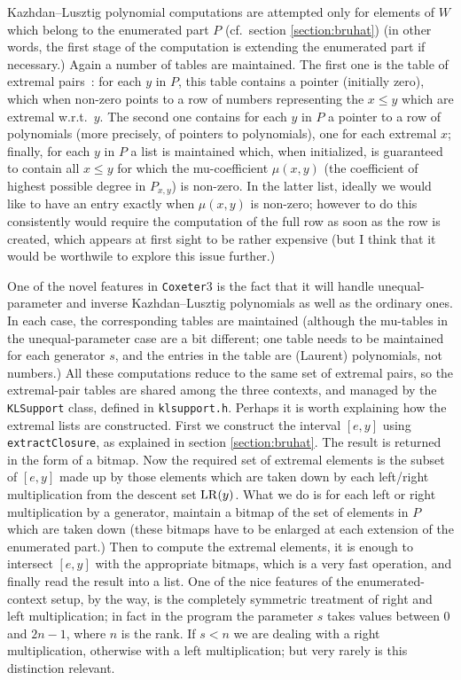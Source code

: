 \documentclass[11pt]{article}
\newcommand{\coxeter}{{\tt Coxeter}}
\newcommand{\klpol}{Kazh\-dan--Lusz\-tig po\-ly\-no\-mial}
\newcommand{\LR}{{\rm LR}}
\begin{document}
\klpol{} computations are attempted only for elements of $W$ which belong
to the enumerated part $P$ (cf.\ section \ref{section:bruhat}) (in other 
words, the first stage of the computation is extending the enumerated part if 
necessary.) Again a number of tables are maintained. The first one is the
table of extremal pairs~: for each $y$ in $P$, this table contains a 
pointer (initially zero), which when non-zero points to a row
of numbers representing the $x\leq y$ which are extremal w.r.t.\ $y$. The
second one contains for each $y$ in $P$ a pointer to a
row of polynomials (more precisely,
of pointers to polynomials), one for each extremal $x$; finally, for each
$y$ in $P$ a list is maintained which, when initialized,
is guaranteed to contain all $x\leq y$
for which the mu-coefficient $\mu(x,y)$ (the coefficient of highest possible
degree in $P_{x,y}$) is non-zero. In the latter list, ideally we would like
to have an entry exactly when $\mu(x,y)$ is non-zero; however to do this
consistently would require the computation of the full row as soon as the
row is created, which appears at first sight to be rather expensive (but I
think that it would be worthwile to explore this issue further.)

One of the novel features in \coxeter3 is the fact that it will handle
unequal-parameter and inverse \klpol s as well as the ordinary ones. In
each case, the corresponding tables are maintained (although the mu-tables
in the unequal-parameter case are a bit different; one table needs to be
maintained for each generator $s$, and the entries in the table are
(Laurent) polynomials, not numbers.) All these computations reduce to the
same set of extremal pairs, so the extremal-pair tables are shared among
the three contexts, and managed by the {\tt KLSupport} class, defined in
{\tt klsupport.h}. Perhaps it is worth explaining how the extremal lists
are constructed. First we construct the interval $[e,y]$ using 
{\tt extractClosure}, as explained in section \ref{section:bruhat}. The
result is returned in the form of a bitmap. Now the required set of extremal
elements is the subset of $[e,y]$ made up by those elements which are taken
down by each left/right multiplication from the descent set $\LR(y)$. What
we do is for each left or right multiplication by a generator, maintain a
bitmap of the set of elements in $P$ which are taken down (these bitmaps
have to be enlarged at each extension of the enumerated part.) Then to
compute the extremal elements, it is enough to intersect $[e,y]$ with the
appropriate bitmaps, which is a very fast operation, and finally read
the result into a list. One of the nice features of the enumerated-context
setup, by the way, is the completely symmetric treatment of right and
left multiplication; in fact in the program the parameter $s$ takes values
between $0$ and $2n-1$, where $n$ is the rank. If $s<n$ we are dealing
with a right multiplication, otherwise with a left multiplication; but very
rarely is this distinction relevant.
\end{document}
